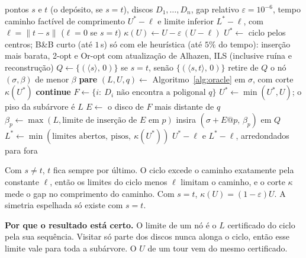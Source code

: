\documentclass[11pt]{article}
\theoremstyle{plain}
\theoremstyle{remark}
\newcommand{\sect}[1]{\par\bigskip{\color{navy}\large\bfseries #1\par}\smallskip}
\begin{document}
\sect{5. O branch-and-bound}

\begin{algorithm}[h]
\caption{CETSP (\texttt{tpp-convex-cetsp})}\label{alg:bnb}
\begin{algorithmic}[1]
\Require pontos $s$ e $t$ (o depósito, se $s=t$), discos $D_1,\dots,D_n$, gap relativo $\varepsilon=10^{-6}$, tempo
\Ensure caminho factível de comprimento $U^\ast-\ell$ e limite inferior $L^\ast-\ell$, com $\ell=\lVert t-s\rVert$ ($\ell=0$ se $s=t$)
\Statex {}
\State $\kappa(U)\gets U-\varepsilon\,(U-\ell)$ 
\State $U^\ast\gets$ ciclo pelos centros; B\&B curto (até $1$\,s) só com ele
\State heurística (até $5\%$ do tempo): inserção mais barata, 2-opt e Or-opt com
  atualização de Alhazen, ILS (inclusive ruína e reconstrução)
\State $Q\gets\{(\langle s\rangle,\,0)\}$ se $s=t$, senão $\{(\langle s,t\rangle,\,0)\}$ 
  \State retire de $Q$ o nó $(\sigma,\beta)$ de menor $\beta$
   \textbf{pare} \EndIf
  \State $(L,U,q)\gets$ Algoritmo~\ref{alg:oracle} em $\sigma$, com corte $\kappa(U^\ast)$
   \textbf{continue}  \EndIf
  \State $F\gets\{i:\ D_i\text{ não encontra a poligonal }q\}$ 
    \State $U^\ast\gets\min(U^\ast,U)$; o piso da subárvore é $L$ 
  \Else
    \State $E\gets$ o disco de $F$ mais distante de $q$
      \State $\beta_p\gets\max(L,\text{limite de inserção de }E\text{ em }p)$ 
       insira $(\sigma+E@p,\,\beta_p)$ em $Q$ \EndIf
    \EndFor
  \EndIf
\EndWhile
\State $L^\ast\gets\min(\text{limites abertos},\ \text{pisos},\ \kappa(U^\ast))$
\State \Return $U^\ast-\ell$ e $L^\ast-\ell$, arredondados para fora
\end{algorithmic}
\end{algorithm}

Com $s\neq t$, $t$ fica sempre por último. O ciclo excede o caminho exatamente pela constante
$\ell$, então os limites do ciclo menos $\ell$ limitam o caminho, e o corte $\kappa$ mede o gap no
comprimento do caminho. Com $s=t$, $\kappa(U)=(1-\varepsilon)U$. A simetria espelhada só existe
com $s=t$.

\textbf{Por que o resultado está certo.} O limite de um nó é o $L$ certificado do ciclo pela
sua sequência. Visitar só parte dos discos nunca alonga o ciclo, então esse limite vale para
toda a subárvore. O $U$ de um tour vem do mesmo certificado.
\end{document}
